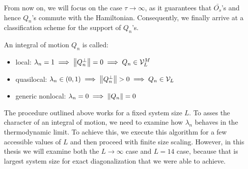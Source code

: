 From now on, we will focus on the case \(\tau \to \infty \), as it guarantees that \(\bar{O_s}\)'s and hence \(Q_n\)'s
commute with the Hamiltonian. 
Consequently, we finally arrive at a classification scheme for the support of \(Q_n\)'s.
\begin{definition}
  An integral of motion \(Q_n\) is called:
  \begin{itemize}
    \item local: \(\lambda_n = 1 \implies \norm{Q_n^{\perp}} = 0 \implies Q_n \in \mathcal{V}^M_L\)
    \item quasilocal: \(\lambda_n \in \left(0,1\right) \implies \norm{Q_n^{\perp}} > 0 \implies Q_n \in \mathcal{V}_L \)
    \item generic nonlocal: \(\lambda_n = 0 \implies \norm{Q_n} = 0\)
  \end{itemize}
  \label{def:classification}
\end{definition}
The procedure outlined above works for a fixed system size \(L\).
To asses the character of an integral of motion, we need to examine how \(\lambda_n\) 
behaves in the thermodynamic limit. To achieve this, we execute this algorithm for a 
few accessible values of \(L\) and then proceed with finite size scaling.
However, in this thesis we will examine both the \(L\to \infty \) case and \(L = 14\)
case, because that is largest system size for exact diagonalization that we were able to achieve.

